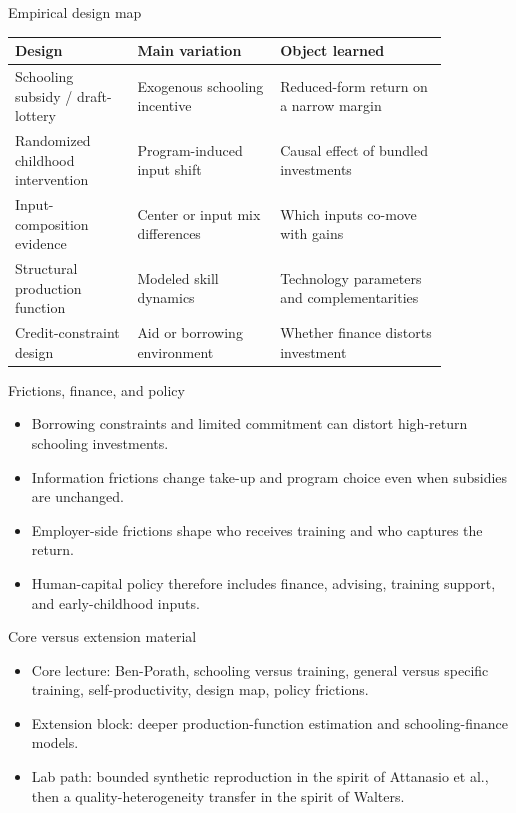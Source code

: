 \documentclass[aspectratio=169,11pt]{beamer}
\begin{document}
\begin{frame}{Empirical design map}
\small
\begin{tabular}{p{0.24\linewidth} p{0.29\linewidth} p{0.33\linewidth}}
\toprule
Design & Main variation & Object learned \\
\midrule
Schooling subsidy / draft-lottery & Exogenous schooling incentive & Reduced-form return on a narrow margin \\
Randomized childhood intervention & Program-induced input shift & Causal effect of bundled investments \\
Input-composition evidence & Center or input mix differences & Which inputs co-move with gains \\
Structural production function & Modeled skill dynamics & Technology parameters and complementarities \\
Credit-constraint design & Aid or borrowing environment & Whether finance distorts investment \\
\bottomrule
\end{tabular}
\end{frame}

\begin{frame}{Frictions, finance, and policy}
\begin{itemize}
    \item Borrowing constraints and limited commitment can distort high-return schooling investments.
    \item Information frictions change take-up and program choice even when subsidies are unchanged.
    \item Employer-side frictions shape who receives training and who captures the return.
    \item Human-capital policy therefore includes finance, advising, training support, and early-childhood inputs.
\end{itemize}
\end{frame}

\begin{frame}{Core versus extension material}
\begin{itemize}
    \item Core lecture: Ben-Porath, schooling versus training, general versus specific training, self-productivity, design map, policy frictions.
    \item Extension block: deeper production-function estimation and schooling-finance models.
    \item Lab path: bounded synthetic reproduction in the spirit of Attanasio et al., then a quality-heterogeneity transfer in the spirit of Walters.
\end{itemize}
\end{frame}
\end{document}
